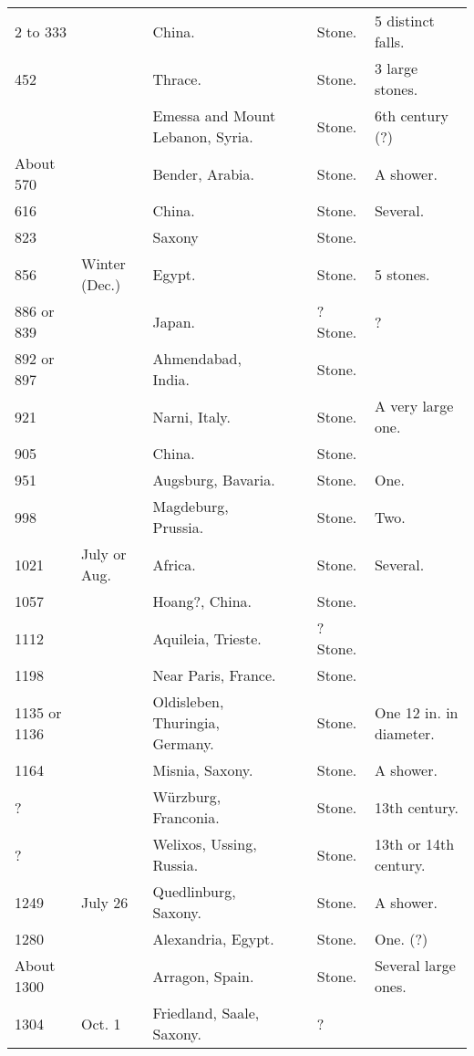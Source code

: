 \documentclass[a4paper, 12pt, oneside]{article}
\begin{document}
\begin{center}
\begin{longtable}{|p{10mm}|p{15mm}|p{32mm}|p{13mm}|p{13mm}|p{26mm}|}
        2 to 333 & ~ & China. & ~ & Stone. & 5 distinct falls. \\
        452 & ~ & Thrace. & ~ & Stone. & 3 large stones. \\
        ~ & ~ & Emessa and Mount Lebanon, Syria. & ~ & Stone. & 6th century (?) \\
        About 570 & ~ & Bender, Arabia. & ~ & Stone. & A shower. \\
        616 & ~ & China. & ~ & Stone. & Several. \\
        823 & ~ & Saxony & ~ & Stone. & ~ \\
        856 & Winter (Dec.) & Egypt. & ~ & Stone. & 5 stones. \\
        886 or 839 & ~ & Japan. & ~ & ? Stone. & ? \\
        892 or 897 & ~ & Ahmendabad, India. & ~ & Stone. & ~ \\
        921 & ~ & Narni, Italy. & ~ & Stone. & A very large one. \\
        905 & ~ & China. & ~ & Stone. & ~ \\
        951 & ~ & Augsburg, Bavaria. & ~ & Stone. & One. \\
        998 & ~ & Magdeburg, Prussia. & ~ & Stone. & Two. \\
        1021 & July or Aug. & Africa. & ~ & Stone. & Several. \\
        1057 & ~ & Hoang?, China. & ~ & Stone. & ~ \\
        1112 & ~ & Aquileia, Trieste. & ~ & ? Stone. & ~ \\
        1198 & ~ & Near Paris, France. & ~ & Stone. & ~ \\
        1135 or 1136 & ~ & Oldisleben, Thuringia, Germany. & ~ & Stone. & One 12 in. in diameter. \\
        1164 & ~ & Misnia, Saxony. & ~ & Stone. & A shower. \\
        ? & ~ & Würzburg, Franconia. & ~ & Stone. & 13th century. \\
        ? & ~ & Welixos, Ussing, Russia. & ~ & Stone. & 13th or 14th century. \\
        1249 & July 26 & Quedlinburg, Saxony. & ~ & Stone. & A shower. \\
        1280 & ~ & Alexandria, Egypt. & ~ & Stone. & One. (?) \\
        About 1300 & ~ & Arragon, Spain. & ~ & Stone. & Several large ones. \\
        1304 & Oct. 1 & Friedland, Saale, Saxony. & ~ & ? & ~ \\

\end{longtable}
\end{center}
\end{document}

